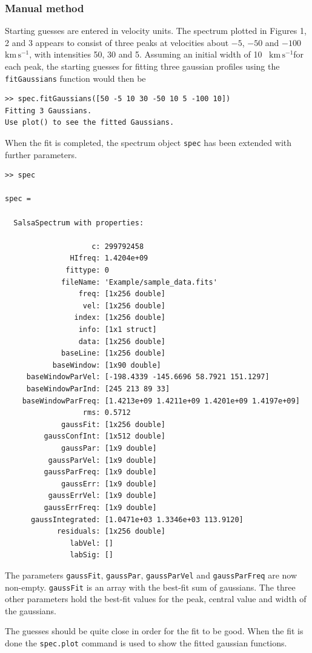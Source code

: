 \documentclass[11pt,a4paper]{article}
\newcommand\kms{$\mathrm{km} \, \mathrm{s}^{-1}$}
\begin{document}
\subsubsection{Manual method}
Starting guesses are entered in velocity units. The spectrum plotted in Figures
1, 2 and 3 appears to consist of three peaks at velocities about $-5$, $-50$
and $-100$~\kms, with intensities 50, 30 and 5.  Assuming an initial width of
10 ~\kms for each peak, the starting guesses for fitting three gaussian
profiles using the \texttt{fitGaussians} function would then be
\begin{lstlisting}
>> spec.fitGaussians([50 -5 10 30 -50 10 5 -100 10])
Fitting 3 Gaussians. 
Use plot() to see the fitted Gaussians.         
\end{lstlisting}
When the fit is completed, the spectrum object \texttt{spec} has been extended
with further parameters. 
\begin{lstlisting}
>> spec

spec = 

  SalsaSpectrum with properties:

                    c: 299792458
               HIfreq: 1.4204e+09
              fittype: 0
             fileName: 'Example/sample_data.fits'
                 freq: [1x256 double]
                  vel: [1x256 double]
                index: [1x256 double]
                 info: [1x1 struct]
                 data: [1x256 double]
             baseLine: [1x256 double]
           baseWindow: [1x90 double]
     baseWindowParVel: [-198.4339 -145.6696 58.7921 151.1297]
     baseWindowParInd: [245 213 89 33]
    baseWindowParFreq: [1.4213e+09 1.4211e+09 1.4201e+09 1.4197e+09]
                  rms: 0.5712
             gaussFit: [1x256 double]
         gaussConfInt: [1x512 double]
             gaussPar: [1x9 double]
          gaussParVel: [1x9 double]
         gaussParFreq: [1x9 double]
             gaussErr: [1x9 double]
          gaussErrVel: [1x9 double]
         gaussErrFreq: [1x9 double]
      gaussIntegrated: [1.0471e+03 1.3346e+03 113.9120]
            residuals: [1x256 double]
               labVel: []
               labSig: []
\end{lstlisting}
The parameters \texttt{gaussFit}, \texttt{gaussPar},
\texttt{gaussParVel} and \texttt{gaussParFreq} are now
non-empty. \texttt{gaussFit} is an array with the best-fit sum of
gaussians. The three other parameters hold the best-fit values for the
peak, central value and width of the gaussians.

The guesses should be quite close in order for the fit to be
good. When the fit is done the \texttt{spec.plot} command is used to show
the fitted gaussian functions.
\end{document}
